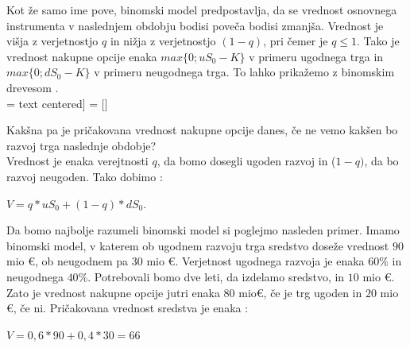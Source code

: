 Kot že samo ime pove, binomski model predpostavlja, da se vrednost osnovnega instrumenta v naslednjem obdobju bodisi poveča bodisi zmanjša. Vrednost je višja z verjetnostjo $q$ in nižja z verjetnostjo $(1-q)$, pri čemer je $q \leq 1$. Tako je vrednost nakupne opcije enaka $max\{0; uS_0 - K\}$ v primeru ugodnega trga in $max\{0; dS_0 - K\}$ v primeru neugodnega trga. To lahko prikažemo z binomskim drevesom \cite[str. 52, 53]{Brach}.\\

 =  text centered]
 = []

Kakšna pa je pričakovana vrednost nakupne opcije danes, če ne vemo kakšen bo razvoj trga naslednje obdobje? \\
Vrednost je enaka verejtnosti $q$, da bomo dosegli ugoden razvoj in ($1-q)$, da bo razvoj neugoden. Tako dobimo \cite[str. 52]{Brach}:
\begin{center}
$V = q * uS_0 + (1-q) * dS_0$.
\end{center}

Da bomo najbolje razumeli binomski model si poglejmo nasleden primer. Imamo binomski model, v katerem ob ugodnem razvoju trga sredstvo doseže vrednost $90$ mio €, ob neugodnem pa $30$ mio €. Verjetnost ugodnega razvoja je enaka $60 \%$ in neugodnega $40 \%$. Potrebovali bomo dve leti, da izdelamo sredstvo, in $10$ mio €. Zato je vrednost nakupne opcije jutri enaka $80$ mio€, če je trg ugoden in $20$ mio €, če ni. Pričakovana vrednost sredstva je enaka \cite[str. 52, 53]{Brach}: 
\begin{center}
$V = 0,6 * 90 + 0,4 * 30 = 66$
\end{center}


